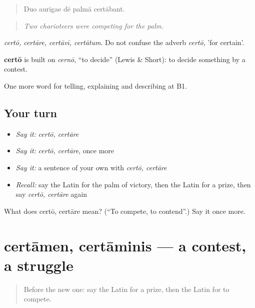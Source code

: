 \begin{quote}
Duo aurīgae dē palmā certābant.
\end{quote}

\begin{quote}
\emph{Two charioteers were competing for the palm.}
\end{quote}

\emph{certō, certāre, certāvī, certātum}. Do not confuse the adverb \emph{certō}, 'for certain'.

\begin{cousinweb}
\textbf{certō} is built on \emph{cernō}, \textquotedblleft{}to decide\textquotedblright{} (Lewis \& Short): to decide something by a contest.
\end{cousinweb}

\begin{grammarlens}[title={What you've built}]
One more word for telling, explaining and describing at B1.
\end{grammarlens}

\subsection*{Your turn}
\begin{itemize}
\raggedright
  \item \emph{Say it:} \emph{certō, certāre}
  \item \emph{Say it:} \emph{certō, certāre}, once more
  \item \emph{Say it:} a sentence of your own with \emph{certō, certāre}
  \item \emph{Recall:} say the Latin for the palm of victory, then the Latin for a prize, then say \emph{certō, certāre} again
\end{itemize}

\begin{tcolorbox}[breakable,colback=teal!4,colframe=teal!35!black,title={Before you move on}]
What does certō, certāre mean? (\textquotedblleft{}To compete, to contend\textquotedblright{}.) Say it once more.
\end{tcolorbox}
\section[certāmen, certāminis]{certāmen, certāminis — a contest, a struggle}

\label{lesson:LA-C337-certamen}



\begin{quote}
Before the new one: say the Latin for a prize, then the Latin for to compete.
\end{quote}

